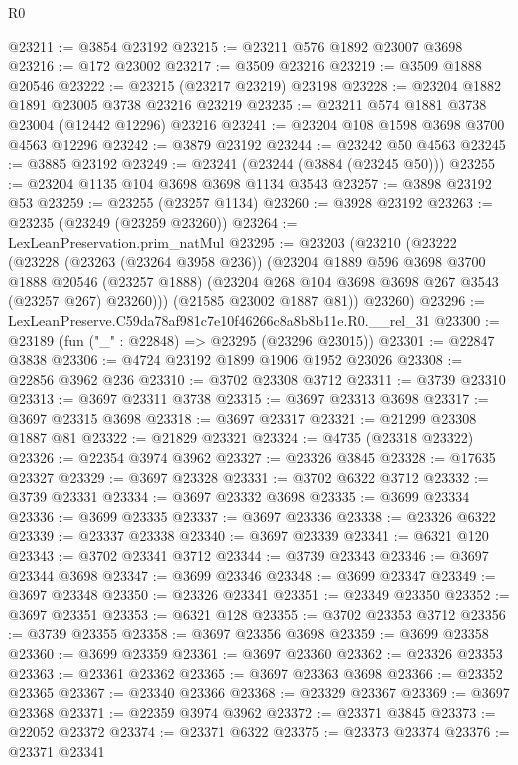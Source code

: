 \begin{lexlean}{R0}
\begin{coremodule}
@23211 := @3854 @23192
@23215 := @23211 @576 @1892 @23007 @3698
@23216 := @172 @23002
@23217 := @3509 @23216
@23219 := @3509 @1888 @20546
@23222 := @23215 (@23217 @23219) @23198
@23228 := @23204 @1882 @1891 @23005 @3738 @23216 @23219
@23235 := @23211 @574 @1881 @3738 @23004 (@12442 @12296) @23216
@23241 := @23204 @108 @1598 @3698 @3700 @4563 @12296
@23242 := @3879 @23192
@23244 := @23242 @50 @4563
@23245 := @3885 @23192
@23249 := @23241 (@23244 (@3884 (@23245 @50)))
@23255 := @23204 @1135 @104 @3698 @3698 @1134 @3543
@23257 := @3898 @23192 @53
@23259 := @23255 (@23257 @1134)
@23260 := @3928 @23192
@23263 := @23235 (@23249 (@23259 @23260))
@23264 := LexLeanPreservation.prim_natMul
@23295 := @23203
    (@23210
      (@23222
        (@23228
          (@23263 (@23264 @3958 @236))
          (@23204
            @1889
            @596
            @3698
            @3700
            @1888
            @20546
            (@23257 @1888)
            (@23204 @268 @104 @3698 @3698 @267 @3543 (@23257 @267) @23260)))
        (@21585 @23002 @1887 @81))
      @23260)
@23296 := LexLeanPreserve.C59da78af981c7e10f46266c8a8b8b11e.R0.__rel_31
@23300 := @23189 (fun ("_" : @22848) => @23295 (@23296 @23015))
@23301 := @22847 @3838
@23306 := @4724 @23192 @1899 @1906 @1952 @23026
@23308 := @22856 @3962 @236
@23310 := @3702 @23308 @3712
@23311 := @3739 @23310
@23313 := @3697 @23311 @3738
@23315 := @3697 @23313 @3698
@23317 := @3697 @23315 @3698
@23318 := @3697 @23317
@23321 := @21299 @23308 @1887 @81
@23322 := @21829 @23321
@23324 := @4735 (@23318 @23322)
@23326 := @22354 @3974 @3962
@23327 := @23326 @3845
@23328 := @17635 @23327
@23329 := @3697 @23328
@23331 := @3702 @6322 @3712
@23332 := @3739 @23331
@23334 := @3697 @23332 @3698
@23335 := @3699 @23334
@23336 := @3699 @23335
@23337 := @3697 @23336
@23338 := @23326 @6322
@23339 := @23337 @23338
@23340 := @3697 @23339
@23341 := @6321 @120
@23343 := @3702 @23341 @3712
@23344 := @3739 @23343
@23346 := @3697 @23344 @3698
@23347 := @3699 @23346
@23348 := @3699 @23347
@23349 := @3697 @23348
@23350 := @23326 @23341
@23351 := @23349 @23350
@23352 := @3697 @23351
@23353 := @6321 @128
@23355 := @3702 @23353 @3712
@23356 := @3739 @23355
@23358 := @3697 @23356 @3698
@23359 := @3699 @23358
@23360 := @3699 @23359
@23361 := @3697 @23360
@23362 := @23326 @23353
@23363 := @23361 @23362
@23365 := @3697 @23363 @3698
@23366 := @23352 @23365
@23367 := @23340 @23366
@23368 := @23329 @23367
@23369 := @3697 @23368
@23371 := @22359 @3974 @3962
@23372 := @23371 @3845
@23373 := @22052 @23372
@23374 := @23371 @6322
@23375 := @23373 @23374
@23376 := @23371 @23341

\end{coremodule}
\end{lexlean}
